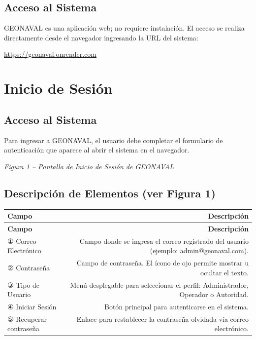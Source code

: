 \documentclass[12pt,a4paper]{article}
\begin{document}
\subsection{Acceso al Sistema}

GEONAVAL es una aplicación web; no requiere instalación. El acceso se realiza directamente desde el navegador ingresando la URL del sistema:

\begin{center}
  \large\url{https://geonaval.onrender.com}
\end{center}

\section{Inicio de Sesión}

\subsection{Acceso al Sistema}

Para ingresar a GEONAVAL, el usuario debe completar el formulario de autenticación que aparece al abrir el sistema en el navegador.

\textit{Figura 1 -- Pantalla de Inicio de Sesión de GEONAVAL}

\subsection{Descripción de Elementos (ver Figura 1)}

\begin{longtable}{LR}
  \toprule
  \textbf{Campo} & \textbf{Descripción} \\
  \midrule
  \endfirsthead
  \toprule
  \textbf{Campo} & \textbf{Descripción} \\
  \midrule
  \endhead
  \bottomrule
  \endfoot
  ① Correo Electrónico & Campo donde se ingresa el correo registrado del usuario (ejemplo: admin@geonaval.com). \\[4pt]
  ② Contraseña         & Campo de contraseña. El ícono de ojo permite mostrar u ocultar el texto. \\[4pt]
  ③ Tipo de Usuario    & Menú desplegable para seleccionar el perfil: Administrador, Operador o Autoridad. \\[4pt]
  ④ Iniciar Sesión     & Botón principal para autenticarse en el sistema. \\[4pt]
  ⑤ Recuperar contraseña & Enlace para restablecer la contraseña olvidada vía correo electrónico. \\
\end{longtable}
\end{document}
